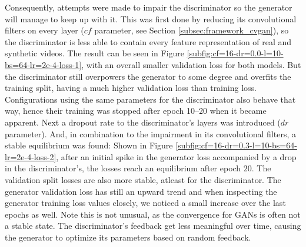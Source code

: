 Consequently, attempts were made to impair the discriminator so the generator will manage to keep up with it. This was first done by reducing its convolutional filters on every layer ($cf$ parameter, see Section \ref{subsec:framework_cvgan}), so the discriminator is less able to contain every feature representation of real and synthetic videos. The result can be seen in Figure \ref{subfig:cf=16-dr=0.0-l=10-bs=64-lr=2e-4-loss-1}, with an overall smaller validation loss for both models. But the discriminator still overpowers the generator to some degree and overfits the training split, having a much higher validation loss than training loss. Configurations using the same parameters for the discriminator also behave that way, hence their training was stopped after epoch 10--20 when it became apparent. Next a dropout rate to the discriminator's layers was introduced ($dr$ parameter). And, in combination to the impairment in its convolutional filters, a stable equilibrium was found: Shown in Figure \ref{subfig:cf=16-dr=0.3-l=10-bs=64-lr=2e-4-loss-2}, after an initial spike in the generator loss accompanied by a drop in the discriminator's, the losses reach an equilibrium after epoch $20$. The validation split losses are also more stable, atleast for the discriminator. The generator validation loss has still an upward trend and when inspecting the generator training loss values closely, we noticed a small increase over the last epochs as well. Note this is not unusual, as the convergence for GANs is often not a stable state. The discriminator's feedback get less meaningful over time, causing the generator to optimize its parameters based on random feedback. 

